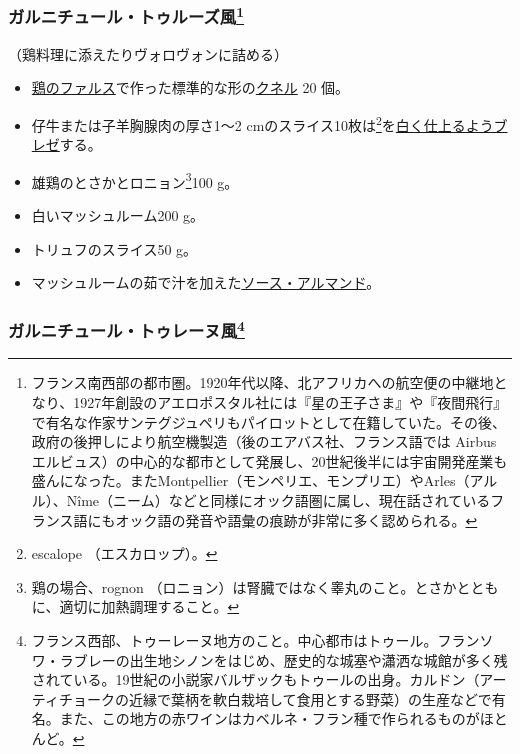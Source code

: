 \begin{recette}
{\subsubsection[ガルニチュール・トゥルーズ風]{\texorpdfstring{ガルニチュール・トゥルーズ風\footnote{フランス南西部の都市圏。1920年代以降、北アフリカへの航空便の中継地となり、1927年創設のアエロポスタル社には『星の王子さま』や『夜間飛行』で有名な作家サンテグジュペリもパイロットとして在籍していた。その後、政府の後押しにより航空機製造（後のエアバス社、フランス語では
  Airbus
  エルビュス）の中心的な都市として発展し、20世紀後半には宇宙開発産業も盛んになった。またMontpellier（モンペリエ、モンプリエ）やArles（アルル）、Nîme（ニーム）などと同様にオック語圏に属し、現在話されているフランス語にもオック語の発音や語彙の痕跡が非常に多く認められる。}}{ガルニチュール・トゥルーズ風}}\label{garniture-toulousaine}}



（鶏料理に添えたりヴォロヴォンに詰める）

\begin{itemize}
\item
  \protect\hyperlink{farce-a}{鶏のファルス}で作った標準的な形の\protect\hyperlink{quenelles-diverses}{クネル}
  20 個。
\item
  仔牛または子羊胸腺肉の厚さ1〜2 cmのスライス10枚は\footnote{escalope
    （エスカロップ）。}を\protect\hyperlink{les-braises-de-viandes-blanches}{白く仕上るようブレゼ}する。
\item
  雄鶏のとさかとロニョン\footnote{鶏の場合、rognon
    （ロニョン）は腎臓ではなく睾丸のこと。とさかとともに、適切に加熱調理すること。}100
  g。
\item
  白いマッシュルーム200 g。
\item
  トリュフのスライス50 g。
\item
  マッシュルームの茹で汁を加えた\protect\hyperlink{sauce-allemande}{ソース・アルマンド}。
\end{itemize}

\atoaki{}

\hypertarget{garniture-tourangelle}{%
\subsubsection[ガルニチュール・トゥレーヌ風]{\texorpdfstring{ガルニチュール・トゥレーヌ風\footnote{フランス西部、トゥーレーヌ地方のこと。中心都市はトゥール。フランソワ・ラブレーの出生地シノンをはじめ、歴史的な城塞や瀟洒な城館が多く残されている。19世紀の小説家バルザックもトゥールの出身。カルドン（アーティチョークの近縁で葉柄を軟白栽培して食用とする野菜）の生産などで有名。また、この地方の赤ワインはカベルネ・フラン種で作られるものがほとんど。}}{ガルニチュール・トゥレーヌ風}}\label{garniture-tourangelle}}


\end{recette}
